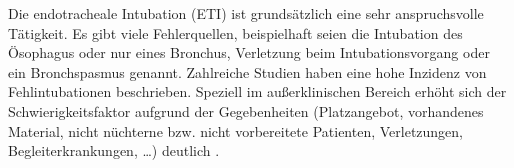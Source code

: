 {%
Die endotracheale Intubation (ETI) ist grundsätzlich eine
sehr anspruchsvolle Tätigkeit.  Es gibt viele
Fehlerquellen, beispielhaft seien die Intubation des
Ösophagus oder nur eines Bronchus, Verletzung
beim Intubationsvorgang oder ein Bronchspasmus genannt.
Zahlreiche Studien haben eine hohe Inzidenz von
Fehlintubationen beschrieben.
Speziell im 
außerklinischen Bereich erhöht sich der
Schwierigkeitsfaktor aufgrund der Gegebenheiten
(Platzangebot, vorhandenes Material, nicht nüchterne bzw.
nicht vorbereitete Patienten, Verletzungen,
Begleiterkrankungen, \ldots) deutlich
\cite{Timmermann2006,Thierbach2004}.

}
